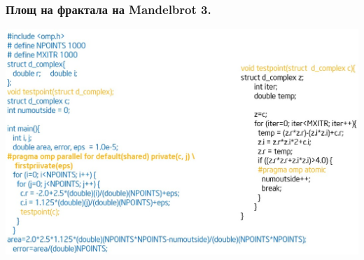 \documentclass{beamer}
\begin{document}
\begin{frame}[plain]
  \frametitle{Площ на фрактала на Mandelbrot 3.}
  \includegraphics[width=1.07\textwidth]{mandelbr2}  
\end{frame}
\end{document}
